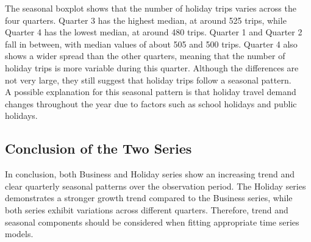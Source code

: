 \noindent The seasonal boxplot shows that the number of holiday trips varies across the four quarters. Quarter 3 has the highest median, at around 525 trips, while Quarter 4 has the lowest median, at around 480 trips. Quarter 1 and Quarter 2 fall in between, with median values of about 505 and 500 trips. Quarter 4 also shows a wider spread than the other quarters, meaning that the number of holiday trips is more variable during this quarter. Although the differences are not very large, they still suggest that holiday trips follow a seasonal pattern.\\
\noindent A possible explanation for this seasonal pattern is that holiday travel demand changes throughout the year due to factors such as school holidays and public holidays.

\subsection{Conclusion of the Two Series}

\noindent In conclusion, both Business and Holiday series show an increasing trend and clear quarterly seasonal patterns over the observation period. The Holiday series demonstrates a stronger growth trend compared to the Business series, while both series exhibit variations across different quarters. Therefore, trend and seasonal components should be considered when fitting appropriate time series models.
